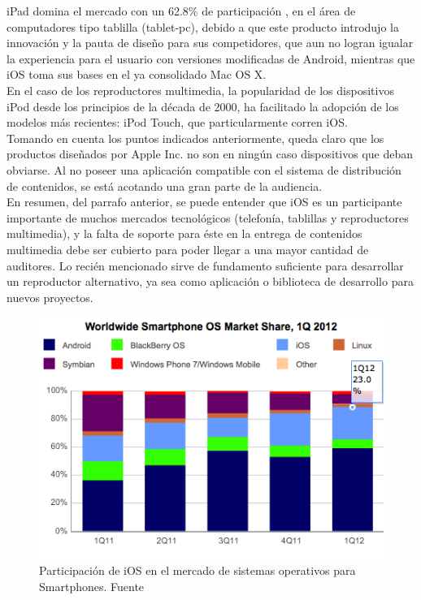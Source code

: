 iPad domina el mercado con un 62.8\% de participación \cite{sota:iPad-market}, en el área de computadores tipo tablilla (tablet-pc), debido a que este producto introdujo la innovación y la pauta de diseño para sus competidores, que aun no logran igualar la experiencia para el usuario con versiones modificadas de Android, mientras que iOS toma sus bases en el ya consolidado Mac OS X.\\

En el caso de los reproductores multimedia, la popularidad de los dispositivos iPod desde los principios de la década de 2000, ha facilitado la adopción de los modelos más recientes: iPod Touch, que particularmente corren iOS.\\

Tomando en cuenta los puntos indicados anteriormente, queda claro que los productos diseñados por Apple Inc. no son en ningún caso dispositivos que deban obviarse. Al no poseer una aplicación compatible con el sistema de distribución de contenidos, se está acotando una gran parte de la audiencia.\\

En resumen, del parrafo anterior, se puede entender que iOS es un participante importante de muchos mercados tecnológicos (telefonía, tablillas y reproductores multimedia), y la falta de soporte para éste en la entrega de contenidos multimedia debe ser cubierto para poder llegar a una mayor cantidad de auditores. Lo recién mencionado sirve de fundamento suficiente para desarrollar un reproductor alternativo, ya sea como aplicación o biblioteca de desarrollo para nuevos proyectos. \\

\begin{figure}[H]
	\centering
	\includegraphics[scale=0.8]{imgs/market-share-2012q1.png} 
	\caption{Participación de iOS en el mercado de sistemas operativos para Smartphones. Fuente \cite{sota:market-smartphones}}
	\label{market-share-2012q1}
\end{figure}



